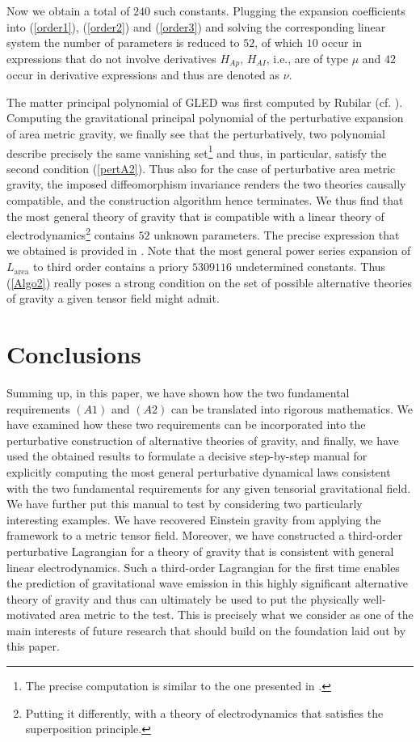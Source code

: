 \documentclass[%
 reprint,
nofootinbib,
 amsmath,amssymb,
 aps,
 prd,
floatfix,
]{revtex4-2}
\begin{document}
Now we obtain a total of $240$ such constants. Plugging the expansion coefficients into (\ref{order1}), (\ref{order2}) and (\ref{order3}) and solving the corresponding linear system the number of parameters is reduced to $52$, of which $10$ occur in expressions that do not involve derivatives $H_{Ap}$, $H_{AI}$, i.e., are of type $\mu$ and $42$ occur in derivative expressions and thus are denoted as $\nu$.

The matter principal polynomial of GLED was first computed by Rubilar (cf. \cite{2009JPhA...42U5402I}).
Computing the gravitational principal polynomial of the perturbative expansion of area metric gravity, we finally see that the perturbatively, two polynomial describe precisely the same vanishing set\footnote{The precise computation is similar to the one presented in \cite{TobiR}.} and thus, in particular, satisfy the second condition (\ref{pertA2}). 
Thus also for the case of perturbative area metric gravity, the imposed diffeomorphism invariance renders the two theories causally compatible, and the construction algorithm hence terminates. 
We thus find that the most general theory of gravity that is compatible with a linear theory of electrodynamics\footnote{Putting it differently, with a theory of electrodynamics that satisfies the superposition principle.} contains $52$ unknown parameters. The precise expression that we obtained is provided in \cite{TobiMaster}.
Note that the most general power series expansion of $L_{\text{area}}$ to third order contains a priory $5309116$ undetermined constants. Thus (\ref{Algo2}) really poses a strong condition on the set of possible alternative theories of gravity a given tensor field might admit. 
\section{Conclusions}
Summing up, in this paper, we have shown how the two fundamental requirements $(A1)$ and $(A2)$ can be translated into rigorous mathematics. We have examined how these two requirements can be incorporated into the perturbative construction of alternative theories of gravity, and finally, we have used the obtained results to formulate a decisive step-by-step manual for explicitly computing the most general perturbative dynamical laws consistent with the two fundamental requirements for any given tensorial gravitational field.  
We have further put this manual to test by considering two particularly interesting examples. We have recovered Einstein gravity from applying the framework to a metric tensor field. Moreover, we have constructed a third-order perturbative Lagrangian for a theory of gravity that is consistent with general linear electrodynamics. Such a third-order Lagrangian for the first time enables the prediction of gravitational wave emission in this highly significant alternative theory of gravity and thus can ultimately be used to put the physically well-motivated area metric to the test. This is precisely what we consider as one of the main interests of future research that should build on the foundation laid out by this paper.  



\end{document}
